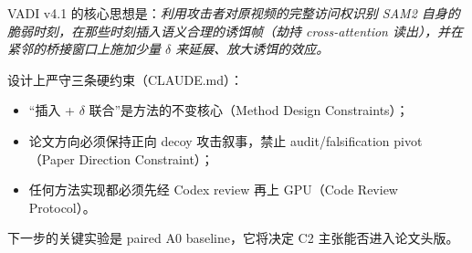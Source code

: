 \documentclass[11pt,a4paper]{ctexart}
\begin{document}
VADI v4.1 的核心思想是：\emph{利用攻击者对原视频的完整访问权识别 SAM2 自身的脆弱时刻，在那些时刻插入语义合理的诱饵帧（劫持 cross-attention 读出），并在紧邻的桥接窗口上施加少量 $\delta$ 来延展、放大诱饵的效应。}

设计上严守三条硬约束（CLAUDE.md）：
\begin{itemize}[leftmargin=2em]
    \item ``插入 + $\delta$ 联合''是方法的不变核心（Method Design Constraints）；
    \item 论文方向必须保持正向 decoy 攻击叙事，禁止 audit/falsification pivot（Paper Direction Constraint）；
    \item 任何方法实现都必须先经 Codex review 再上 GPU（Code Review Protocol）。
\end{itemize}

下一步的关键实验是 paired A0 baseline，它将决定 C2 主张能否进入论文头版。
\end{document}
